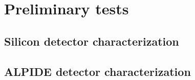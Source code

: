 \documentclass[../../main/main.tex]{subfiles}
\begin{document}
\section{Preliminary tests}



\subsection{Silicon detector characterization}



\subsection{ALPIDE detector characterization}
\end{document}
